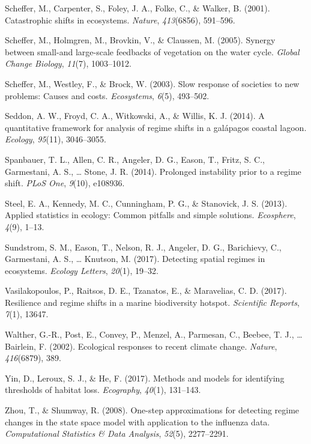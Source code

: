\documentclass[12pt,twoside,openany]{reedthesis}
\begin{document}
\hypertarget{ref-scheffer_catastrophic_2001}{}
Scheffer, M., Carpenter, S., Foley, J. A., Folke, C., \& Walker, B.
(2001). Catastrophic shifts in ecosystems. \emph{Nature},
\emph{413}(6856), 591--596.

\hypertarget{ref-scheffer2005synergy}{}
Scheffer, M., Holmgren, M., Brovkin, V., \& Claussen, M. (2005). Synergy
between small-and large-scale feedbacks of vegetation on the water
cycle. \emph{Global Change Biology}, \emph{11}(7), 1003--1012.

\hypertarget{ref-scheffer2003slow}{}
Scheffer, M., Westley, F., \& Brock, W. (2003). Slow response of
societies to new problems: Causes and costs. \emph{Ecosystems},
\emph{6}(5), 493--502.

\hypertarget{ref-seddon2014quantitative}{}
Seddon, A. W., Froyd, C. A., Witkowski, A., \& Willis, K. J. (2014). A
quantitative framework for analysis of regime shifts in a galápagos
coastal lagoon. \emph{Ecology}, \emph{95}(11), 3046--3055.

\hypertarget{ref-spanbauer_prolonged_2014}{}
Spanbauer, T. L., Allen, C. R., Angeler, D. G., Eason, T., Fritz, S. C.,
Garmestani, A. S., \ldots{} Stone, J. R. (2014). Prolonged instability
prior to a regime shift. \emph{PLoS One}, \emph{9}(10), e108936.

\hypertarget{ref-steel2013applied}{}
Steel, E. A., Kennedy, M. C., Cunningham, P. G., \& Stanovick, J. S.
(2013). Applied statistics in ecology: Common pitfalls and simple
solutions. \emph{Ecosphere}, \emph{4}(9), 1--13.

\hypertarget{ref-sundstrom_detecting_2017}{}
Sundstrom, S. M., Eason, T., Nelson, R. J., Angeler, D. G., Barichievy,
C., Garmestani, A. S., \ldots{} Knutson, M. (2017). Detecting spatial
regimes in ecosystems. \emph{Ecology Letters}, \emph{20}(1), 19--32.

\hypertarget{ref-vasilakopoulos2017resilience}{}
Vasilakopoulos, P., Raitsos, D. E., Tzanatos, E., \& Maravelias, C. D.
(2017). Resilience and regime shifts in a marine biodiversity hotspot.
\emph{Scientific Reports}, \emph{7}(1), 13647.

\hypertarget{ref-walther_ecological_2002}{}
Walther, G.-R., Post, E., Convey, P., Menzel, A., Parmesan, C., Beebee,
T. J., \ldots{} Bairlein, F. (2002). Ecological responses to recent
climate change. \emph{Nature}, \emph{416}(6879), 389.

\hypertarget{ref-yin2017methods}{}
Yin, D., Leroux, S. J., \& He, F. (2017). Methods and models for
identifying thresholds of habitat loss. \emph{Ecography}, \emph{40}(1),
131--143.

\hypertarget{ref-zhou2008one}{}
Zhou, T., \& Shumway, R. (2008). One-step approximations for detecting
regime changes in the state space model with application to the
influenza data. \emph{Computational Statistics \& Data Analysis},
\emph{52}(5), 2277--2291.


\end{document}
